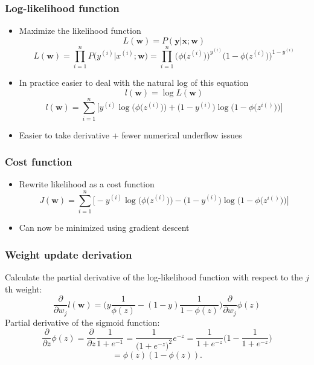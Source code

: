 \documentclass{beamer}
\begin{document}
\begin{frame}
  \frametitle{Log-likelihood function}
  \begin{itemize}
  \item Maximize the likelihood function
    \[
    L(\mathbf{w}) = P(\mathbf{y} | \mathbf{x}; \mathbf{w})
    \]
    \[
    L(\mathbf{w}) = \prod_{i=1}^{n} P \big( y^{(i)} | x^{(i)}; \mathbf{w} \big) =  \prod_{i=1}^{n} \bigg( \phi \big(z^{(i)} \big) \bigg) ^ {y^{(i)}} \bigg( 1 - \phi \big( z^{(i)} \big) \bigg)^{1-y^{(i)}}
    \]
  \item In practice easier to deal with the natural log of this equation
    \[
    l(\mathbf{w}) = \log L(\mathbf{w})
    \]
    \[
    l(\mathbf{w}) = \sum_{i=1}^{n} \Bigg[ y^{(i)} \log \bigg(\phi \big( z^{(i)} \big) \bigg) + \bigg(1 - y^{(i)} \bigg) \log \bigg( 1 - \phi \big( z^{i()} \big) \bigg)  \Bigg]
    \]
    \item Easier to take derivative + fewer numerical underflow issues
  \end{itemize}
\end{frame}

\begin{frame}
  \frametitle{Cost function}
  \begin{itemize}
  \item Rewrite likelihood as a cost function
    \[
    J(\mathbf{w}) = \sum_{i=1}^{n} \Bigg[- y^{(i)} \log \bigg(\phi \big( z^{(i)} \big) \bigg) - \bigg(1 - y^{(i)} \bigg) \log \bigg( 1 - \phi \big( z^{i()} \big) \bigg)  \Bigg]
    \]
  \item Can now be minimized using gradient descent
  \end{itemize} \href{https://github.com/rasbt/python-machine-learning-book/blob/master/code/ch03/ch03.ipynb}{}
\end{frame}

\begin{frame}
  \frametitle{Weight update derivation}
  Calculate the partial derivative of the log-likelihood function with respect to the $j$th weight:
  \[
  \frac{\partial}{\partial w_j} l(\mathbf{w}) = \Bigg( y \frac{1}{\phi(z)}  - (1-y) \frac{1}{1-\phi(z)}   \Bigg)   \frac{\partial}{\partial w_j} \phi(z)
  \]
  Partial derivative of the sigmoid function:
  \[
  \frac{\partial}{\partial z} \phi(z) = \frac{\partial}{\partial z} \frac{1}{1 + e^{-1}} = \frac{1}{\big( 1 + e^{-z}\big)^2} e^{-z} = \frac{1}{1 + e^{-z}} \bigg( 1 - \frac{1}{1 + e^{-z}} \bigg)
  \]
  \[
  = \phi(z)(1-\phi(z)).
  \]
\end{frame}
\end{document}
